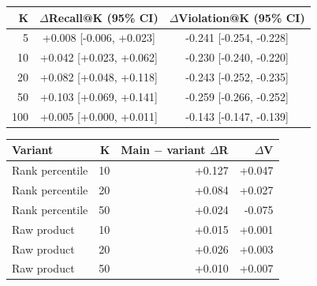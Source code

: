 \noindent
\begin{minipage}[t]{0.48\textwidth}
\centering
\small
\setlength{\tabcolsep}{4pt}
\begin{tabular}{rcc}
\toprule
K & $\Delta$Recall@K (95\% CI) & $\Delta$Violation@K (95\% CI) \\
\midrule
5 & +0.008 [-0.006, +0.023] & -0.241 [-0.254, -0.228] \\
10 & +0.042 [+0.023, +0.062] & -0.230 [-0.240, -0.220] \\
20 & +0.082 [+0.048, +0.118] & -0.243 [-0.252, -0.235] \\
50 & +0.103 [+0.069, +0.141] & -0.259 [-0.266, -0.252] \\
100 & +0.005 [+0.000, +0.011] & -0.143 [-0.147, -0.139] \\
\bottomrule
\end{tabular}
\label{tab:supp-main-grid}
\end{minipage}
\hfill
\begin{minipage}[t]{0.48\textwidth}
\centering
\small
\setlength{\tabcolsep}{5pt}
\begin{tabular}{lrrr}
\toprule
Variant & K & Main $-$ variant $\Delta$R & $\Delta$V \\
\midrule
Rank percentile & 10 & +0.127 & +0.047 \\
Rank percentile & 20 & +0.084 & +0.027 \\
Rank percentile & 50 & +0.024 & -0.075 \\
Raw product & 10 & +0.015 & +0.001 \\
Raw product & 20 & +0.026 & +0.003 \\
Raw product & 50 & +0.010 & +0.007 \\
\bottomrule
\end{tabular}
\label{tab:supp-normalization}
\end{minipage}

